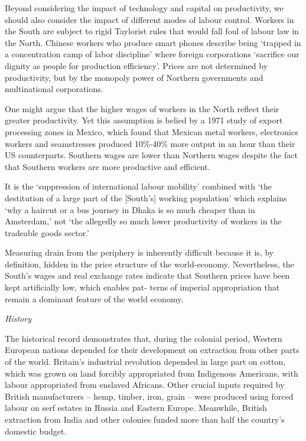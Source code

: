 \documentclass[
]{book}
\begin{document}
Beyond considering the impact of technology and capital on productivity,
we should also consider the impact of different modes of labour control.
Workers in the South are subject to rigid Taylorist rules that
would fall foul of labour law in the North.
Chinese workers who produce smart phones describe being `trapped in a concentration
camp of labor discipline' where foreign corporations `sacrifice our dignity
as people for production efficiency'.
Prices are not determined by productivity, but by the monopoly power of
Northern governments and multinational corporations.

One might argue that the higher wages of workers in the North
reflect their greater productivity.
Yet this assumption is belied by a 1971 study of export processing zones in Mexico, which
found that Mexican metal workers, electronics workers and seamstresses produced 10\%-40\% more
output in an hour than their US counterparts.
Southern wages are lower than Northern wages despite the fact that Southern
workers are more productive and efficient.

It is the `suppression of international labour mobility' combined
with `the destitution of a large part of the {[}South's{]}
working population' which explains `why a haircut or a bus journey in Dhaka is so much cheaper
than in Amsterdam,' not `the allegedly so much lower productivity of workers in the tradeable
goods sector.'

Measuring drain from the periphery is inherently difficult because it is,
by definition, hidden in the price structure of the world-economy. Nevertheless, the South's wages and
real exchange rates indicate that Southern prices have been kept artificially low, which enables pat-
terns of imperial appropriation that remain a dominant feature of the world economy.

\emph{History}

The historical record demonstrates that, during the colonial period,
Western European nations depended for their development on extraction
from other parts of the world.
Britain's industrial revolution depended in large part on cotton,
which was grown on land forcibly appropriated from Indigenous Americans,
with labour appropriated from enslaved Africans.
Other crucial inputs required by British manufacturers -- hemp, timber, iron, grain --
were produced using forced labour on serf estates in Russia and Eastern Europe.
Meanwhile, British extraction from India and other colonies funded
more than half the country's domestic budget.
\end{document}
